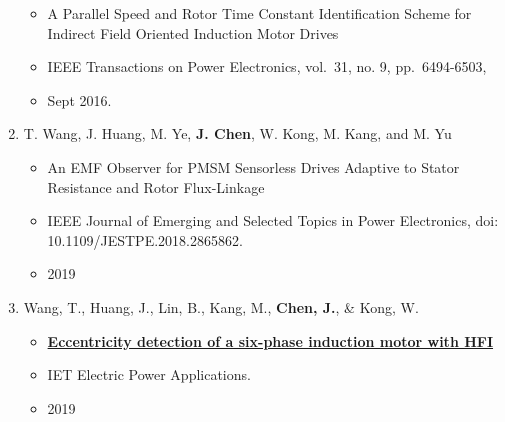\documentclass[]{article}
\providecommand{\tightlist}{%
  \setlength{\itemsep}{0pt}\setlength{\parskip}{0pt}}
\begin{document}
\begin{enumerate}
  \begin{itemize}
  \tightlist
  \item
    A Parallel Speed and Rotor Time Constant Identification Scheme for
    Indirect Field Oriented Induction Motor Drives
  \item
    IEEE Transactions on Power Electronics, vol.~31, no. 9,
    pp.~6494-6503,
  \item
    Sept 2016.
  \end{itemize}
\item
  T. Wang, J. Huang, M. Ye, \textbf{J. Chen}, W. Kong, M. Kang, and M.
  Yu

  \begin{itemize}
  \tightlist
  \item
    An EMF Observer for PMSM Sensorless Drives Adaptive to Stator
    Resistance and Rotor Flux-Linkage
  \item
    IEEE Journal of Emerging and Selected Topics in Power Electronics,
    doi: 10.1109/JESTPE.2018.2865862.
  \item
    2019
  \end{itemize}
\item
  Wang, T., Huang, J., Lin, B., Kang, M., \textbf{Chen, J.}, \& Kong, W.

  \begin{itemize}
  \tightlist
  \item
    \href{https://github.com/horychen/Publications/blob/master/wt-2019-eccentricity.pdf}{\textbf{Eccentricity
    detection of a six-phase induction motor with HFI}}
  \item
    IET Electric Power Applications.
  \item
    2019
  \end{itemize}
\end{enumerate}
\end{document}

